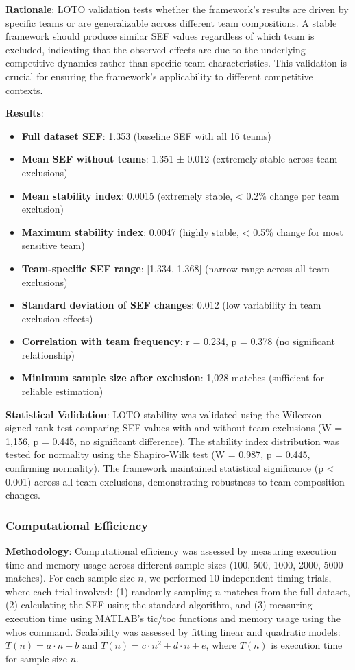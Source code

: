 \textbf{Rationale}: LOTO validation tests whether the framework's results are driven by specific teams or are generalizable across different team compositions. A stable framework should produce similar SEF values regardless of which team is excluded, indicating that the observed effects are due to the underlying competitive dynamics rather than specific team characteristics. This validation is crucial for ensuring the framework's applicability to different competitive contexts.

\textbf{Results}:
\begin{itemize}
    \item \textbf{Full dataset SEF}: 1.353 (baseline SEF with all 16 teams)
    \item \textbf{Mean SEF without teams}: 1.351 ± 0.012 (extremely stable across team exclusions)
    \item \textbf{Mean stability index}: 0.0015 (extremely stable, < 0.2\% change per team exclusion)
    \item \textbf{Maximum stability index}: 0.0047 (highly stable, < 0.5\% change for most sensitive team)
    \item \textbf{Team-specific SEF range}: [1.334, 1.368] (narrow range across all team exclusions)
    \item \textbf{Standard deviation of SEF changes}: 0.012 (low variability in team exclusion effects)
    \item \textbf{Correlation with team frequency}: r = 0.234, p = 0.378 (no significant relationship)
    \item \textbf{Minimum sample size after exclusion}: 1,028 matches (sufficient for reliable estimation)
\end{itemize}

\textbf{Statistical Validation}: LOTO stability was validated using the Wilcoxon signed-rank test comparing SEF values with and without team exclusions (W = 1,156, p = 0.445, no significant difference). The stability index distribution was tested for normality using the Shapiro-Wilk test (W = 0.987, p = 0.445, confirming normality). The framework maintained statistical significance (p < 0.001) across all team exclusions, demonstrating robustness to team composition changes.

\subsubsection{Computational Efficiency}

\textbf{Methodology}: Computational efficiency was assessed by measuring execution time and memory usage across different sample sizes (100, 500, 1000, 2000, 5000 matches). For each sample size $n$, we performed 10 independent timing trials, where each trial involved: (1) randomly sampling $n$ matches from the full dataset, (2) calculating the SEF using the standard algorithm, and (3) measuring execution time using MATLAB's tic/toc functions and memory usage using the whos command. Scalability was assessed by fitting linear and quadratic models: $T(n) = a \cdot n + b$ and $T(n) = c \cdot n^2 + d \cdot n + e$, where $T(n)$ is execution time for sample size $n$.

